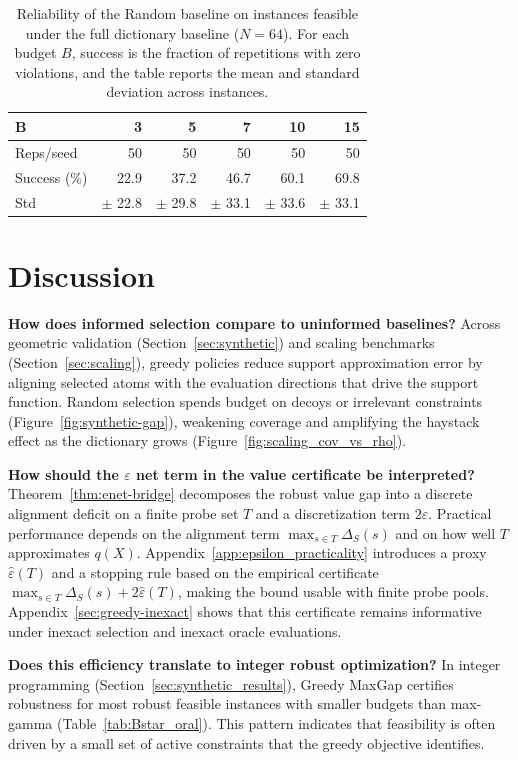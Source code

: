 \documentclass[accepted]{uai2026}
\theoremstyle{plain}
\theoremstyle{definition}
\theoremstyle{remark}
\begin{document}
\begin{table}[!h]
\centering\small
\caption{Reliability of the Random baseline on instances feasible under the full dictionary baseline ($N=64$). For each budget $B$, success is the fraction of repetitions with zero violations, and the table reports the mean and standard deviation across instances.}
\label{tab:random_patterns_oral}
\begin{tabular}{lrrrrr}
\toprule
B & 3 & 5 & 7 & 10 & 15 \\
\midrule
Reps/seed & 50 & 50 & 50 & 50 & 50 \\
Success (\%) & 22.9 & 37.2 & 46.7 & 60.1 & 69.8 \\
Std & $\pm$ 22.8 & $\pm$ 29.8 & $\pm$ 33.1 & $\pm$ 33.6 & $\pm$ 33.1 \\
\bottomrule
\end{tabular}
\end{table}

\section{Discussion}
\label{sec:discussion}

\noindent\textbf{How does informed selection compare to uninformed baselines?}
Across geometric validation (Section~\ref{sec:synthetic}) and scaling benchmarks (Section~\ref{sec:scaling}), greedy policies reduce support approximation error by aligning selected atoms with the evaluation directions that drive the support function. Random selection spends budget on decoys or irrelevant constraints (Figure~\ref{fig:synthetic-gap}), weakening coverage and amplifying the haystack effect as the dictionary grows (Figure~\ref{fig:scaling_cov_vs_rho}).

\noindent\textbf{How should the $\varepsilon$ net term in the value certificate be interpreted?}
Theorem~\ref{thm:enet-bridge} decomposes the robust value gap into a discrete alignment deficit on a finite probe set $T$ and a discretization term $2\varepsilon$. Practical performance depends on the alignment term $\max_{s\in T}\Delta_S(s)$ and on how well $T$ approximates $q(X)$. Appendix~\ref{app:epsilon_practicality} introduces a proxy $\hat{\varepsilon}(T)$ and a stopping rule based on the empirical certificate $\max_{s\in T}\Delta_S(s) + 2\hat{\varepsilon}(T)$, making the bound usable with finite probe pools. Appendix~\ref{sec:greedy-inexact} shows that this certificate remains informative under inexact selection and inexact oracle evaluations.

\noindent\textbf{Does this efficiency translate to integer robust optimization?}
In integer programming (Section~\ref{sec:synthetic_results}), Greedy MaxGap certifies robustness for most robust feasible instances with smaller budgets than max-gamma (Table~\ref{tab:Bstar_oral}). This pattern indicates that feasibility is often driven by a small set of active constraints that the greedy objective identifies.
\end{document}
